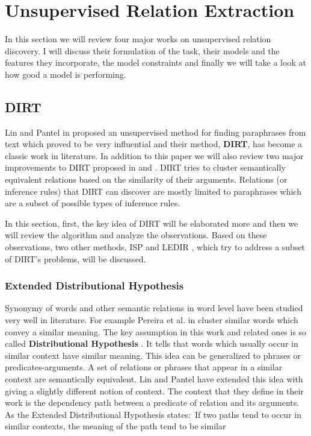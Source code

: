 \section{Unsupervised Relation Extraction}
\label{sec:related}


In this section we will review four major works on unsupervised relation
discovery.
 I will discuss their formulation of the task, their models
 and the features they incorporate, the model constraints and finally we will take a look at how good a model is performing.


\subsection{DIRT}
\label{ssec:unsupervised}

Lin and Pantel in \cite{Lin2001} proposed an unsupervised method for finding paraphrases from text which  
proved to be very influential and their method, \textbf{DIRT}, has become a classic work in literature.
 In addition
 to this paper we will also review two major improvements to DIRT proposed in \cite{Bhagat2007} and \cite{Pantel2007}.
DIRT tries to cluster semantically equivalent relations based on the similarity of their arguments. Relations
(or inference rules) that DIRT can discover are mostly limited to paraphrases which are a subset of possible types of inference rules.

In this section, first, the key idea of DIRT will be elaborated more and then we will review the algorithm and analyze the observations.
Based on these observations, two other methods, ISP \cite{Pantel2007} and LEDIR \cite{Bhagat2007}, 
which try to address a subset of DIRT's problems, will be discussed.

\subsubsection{Extended Distributional Hypothesis}
\label{ssec:assumption}

Synonymy of words and other semantic relations in word level have been studied very well in literature.
For example Pereira et al. in \cite{Pereira1993} 
cluster similar words which convey a similar meaning. The key assumption in this work and related ones is so called
 \textbf{Distributional Hypothesis} \cite{Harris1981}
 . It tells that words which usually occur in similar context have similar meaning. This idea can be generalized
  to phrases or predicates-arguments. A set of relations or phrases that appear in a similar context
  are semantically equivalent. Lin and Pantel have extended this idea with giving a slightly different notion
   of context. The context that they define in their work is the dependency path between a predicate of
    relation and its arguments. As the Extended Distributional Hypothesis
    states:~If two paths tend to occur in similar contexts, the meaning of
     the path tend to be similar
    
